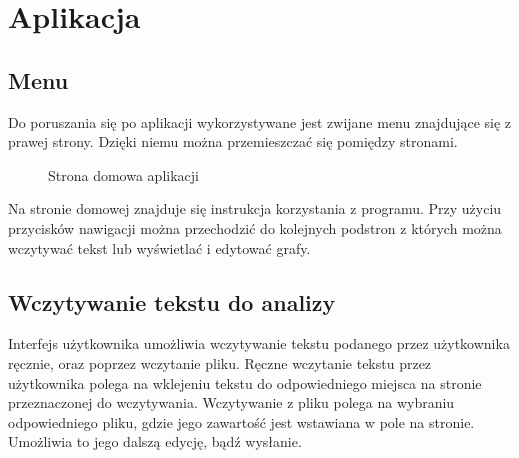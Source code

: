\documentclass[12pt,a4paper]{article} %
\begin{document}
\section{Aplikacja}

    \subsection{Menu}
    
    Do poruszania się po aplikacji wykorzystywane jest zwijane menu znajdujące się z prawej strony. Dzięki niemu można przemieszczać się pomiędzy stronami.
            
            \begin{figure}[h!]
                \centering
                \caption{Strona domowa aplikacji}
            \end{figure}
            
            
            
    Na stronie domowej znajduje się instrukcja korzystania z programu. Przy użyciu przycisków nawigacji można przechodzić do kolejnych podstron z których można wczytywać tekst lub wyświetlać i edytować grafy.
            
        
    \subsection{Wczytywanie tekstu do analizy}
        
        Interfejs użytkownika umożliwia wczytywanie tekstu podanego przez użytkownika ręcznie, oraz poprzez wczytanie pliku. Ręczne wczytanie tekstu przez użytkownika polega na wklejeniu tekstu do odpowiedniego miejsca na stronie przeznaczonej do wczytywania. Wczytywanie z pliku polega na wybraniu odpowiedniego pliku, gdzie jego zawartość jest wstawiana w pole na stronie. Umożliwia to jego dalszą edycję, bądź wysłanie.
    
\end{document}
